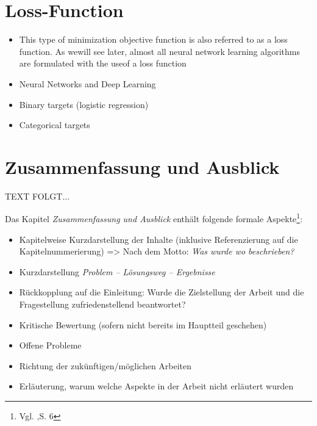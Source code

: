\documentclass[a4paper,12pt,oneside]{article}
\begin{document}
  \section{Loss-Function}
  \begin{tcolorbox}[title={Inhalte der \textit{Loss-Function}}]
   \begin{itemize}
     \item This type of minimization objective function is also referred to as a loss function. As wewill see later, almost all neural network learning algorithms are formulated with the useof a loss function
      \item Neural Networks and Deep Learning
      \item Binary targets (logistic regression)
      \item Categorical targets
  \end{itemize}  
  \end{tcolorbox}

  \newpage 
  \section{Zusammenfassung und Ausblick}\label{kap_zusammfAusbl}  
   TEXT FOLGT...
   
    \vspace{1cm}
 \begin{tcolorbox}[title={Inhalte der \textit{Zusammenfassung und Ausblick}}]
Das Kapitel \textit{Zusammenfassung und Ausblick} enthält folgende formale Aspekte\footnote{Vgl. \cite{BBoJ},S. 6}:
\begin{itemize}
\item Kapitelweise Kurzdarstellung der Inhalte (inklusive Referenzierung auf die Kapitelnummerierung) => Nach dem Motto: \textit{Was wurde wo beschrieben?}
\item Kurzdarstellung \textit{Problem – Lösungsweg – Ergebnisse}
\item Rückkopplung auf die Einleitung: Wurde die Zielstellung der Arbeit und die Fragestellung zufriedenstellend beantwortet?
\item Kritische Bewertung (sofern nicht bereits im Hauptteil geschehen)
\item Offene Probleme
\item Richtung der zukünftigen/möglichen Arbeiten
\item Erläuterung, warum welche Aspekte in der Arbeit nicht erläutert wurden
\end{itemize}
  \end{tcolorbox}
   
\end{document}
